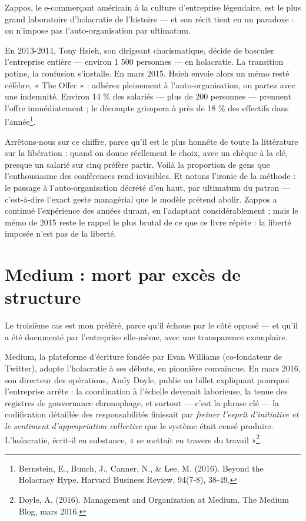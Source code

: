Zappos, le e-commerçant américain à la culture d'entreprise légendaire, est le plus grand laboratoire d'holacratie de l'histoire — et son récit tient en un paradoxe : on n'impose pas l'auto-organisation par ultimatum.

En 2013-2014, Tony Hsieh, son dirigeant charismatique, décide de basculer l'entreprise entière — environ 1 500 personnes — en holacratie. La transition patine, la confusion s'installe. En mars 2015, Hsieh envoie alors un mémo resté célèbre, « The Offer » : adhérez pleinement à l'auto-organisation, ou partez avec une indemnité. Environ 14 \% des salariés — plus de 200 personnes — prennent l'offre immédiatement ; le décompte grimpera à près de 18 \% des effectifs dans l'année\footnote{Bernstein, E., Bunch, J., Canner, N., \& Lee, M. (2016). Beyond the Holacracy Hype. Harvard Business Review, 94(7-8), 38-49.}.

Arrêtons-nous sur ce chiffre, parce qu'il est le plus honnête de toute la littérature sur la libération : quand on donne réellement le choix, avec un chèque à la clé, presque un salarié sur cinq préfère partir. Voilà la proportion de gens que l'enthousiasme des conférences rend invisibles. Et notons l'ironie de la méthode : le passage à l'auto-organisation décrété d'en haut, par ultimatum du patron — c'est-à-dire l'exact geste managérial que le modèle prétend abolir. Zappos a continué l'expérience des années durant, en l'adaptant considérablement ; mais le mémo de 2015 reste le rappel le plus brutal de ce que ce livre répète : la liberté imposée n'est pas de la liberté.

\section{Medium : mort par excès de structure}

Le troisième cas est mon préféré, parce qu'il échoue par le côté opposé — et qu'il a été documenté par l'entreprise elle-même, avec une transparence exemplaire.

Medium, la plateforme d'écriture fondée par Evan Williams (co-fondateur de Twitter), adopte l'holacratie à ses débuts, en pionnière convaincue. En mars 2016, son directeur des opérations, Andy Doyle, publie un billet expliquant pourquoi l'entreprise arrête : la coordination à l'échelle devenait laborieuse, la tenue des registres de gouvernance chronophage, et surtout — c'est la phrase clé — la codification détaillée des responsabilités finissait par \emph{freiner l'esprit d'initiative et le sentiment d'appropriation collective} que le système était censé produire. L'holacratie, écrit-il en substance, « se mettait en travers du travail »\footnote{Doyle, A. (2016). Management and Organization at Medium. The Medium Blog, mars 2016.}.

